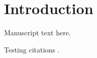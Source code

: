 \documentclass{sig-alternate}
\begin{document}
\section{Introduction}

Manuscript text here.

Testing citations \cite{burns_cambridge_2012, Gimenez2007, Hoffman2014}.


%
%
%
%
%
%
%
\end{document}
